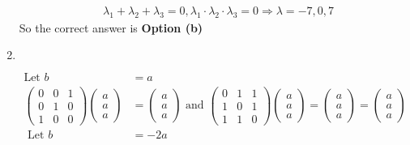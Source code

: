 \begin{enumerate}
\begin{answer}
\begin{align*}
		&\lambda_{1}+\lambda_{2}+\lambda_{3}=0, \lambda_{1} \cdot \lambda_{2} \cdot \lambda_{3}=0 \Rightarrow \lambda=-7,0,7
		\end{align*}
			So the correct answer is \textbf{Option (b)}
	\end{answer}
	\item $\left. \right. $		
	\begin{answer}
		\begin{align*}
		\text{Let }b&=a\\
		\left(\begin{array}{lll}0 & 0 & 1 \\ 0 & 1 & 0 \\ 1 & 0 & 0\end{array}\right)\left(\begin{array}{l}a \\ a \\ a\end{array}\right)&=\left(\begin{array}{l}a \\ a \\ a\end{array}\right)\text{ and }\left(\begin{array}{lll}0 & 1 & 1 \\ 1 & 0 & 1 \\ 1 & 1 & 0\end{array}\right)\left(\begin{array}{l}a \\ a \\ a\end{array}\right)=\left(\begin{array}{l}a \\ a \\ a\end{array}\right)=\left(\begin{array}{l}a \\ a \\ a\end{array}\right)\\
	\text{	Let }b&=-2 a\\

\end{align*}
\end{answer}
\end{enumerate}
